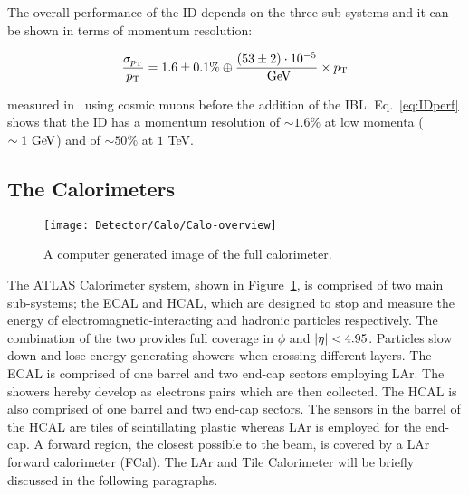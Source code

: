				The overall performance of the \ac{ID} depends on the three sub-systems and it can be shown in terms of momentum resolution: 

				\begin{equation}
				\label{eq:IDperf}
					\displaystyle \frac{\sigma_{\pt}}{\pt} = 1.6 \pm 0.1\% \oplus \frac{(53 \pm 2) \cdot 10^{-5}}{\GeV} \times \pt
				\end{equation}

				\noindent measured in~\cite{Aad2011} using cosmic muons before the addition of the \ac{IBL}. Eq.~\ref{eq:IDperf} shows that the \ac{ID} has a momentum resolution of $\sim 1.6\%$ at low momenta ($\sim 1 \GeV$) and of $\sim 50\%$ at $1$ TeV.

		\subsection{The Calorimeters}

			\begin{figure}[!htb]
				\centering
				\texttt{[image: Detector/Calo/Calo-overview]}
				\caption{A computer generated image of the full calorimeter.}
				\label{fig:Calo}
			\end{figure}

			The \ac{ATLAS} Calorimeter system, shown in Figure~\ref{fig:Calo}, is comprised of two main sub-systems; the \ac{ECAL} and \ac{HCAL}, which are designed to stop and measure the energy of electromagnetic-interacting and hadronic particles respectively. The combination of the two provides full coverage in $\phi$ and $|\eta| < 4.95$. Particles slow down and lose energy generating showers when crossing different layers. The \ac{ECAL} is comprised of one barrel and two end-cap sectors employing \ac{LAr}. The showers hereby develop as electrons pairs which are then collected. The \ac{HCAL} is also comprised of one barrel and two end-cap sectors. The sensors in the barrel of the \ac{HCAL} are tiles of scintillating plastic whereas \ac{LAr} is employed for the end-cap. A forward region, the closest possible to the beam, is covered by a \ac{LAr} forward calorimeter (FCal). The \ac{LAr} and Tile Calorimeter will be briefly discussed in the following paragraphs. 

